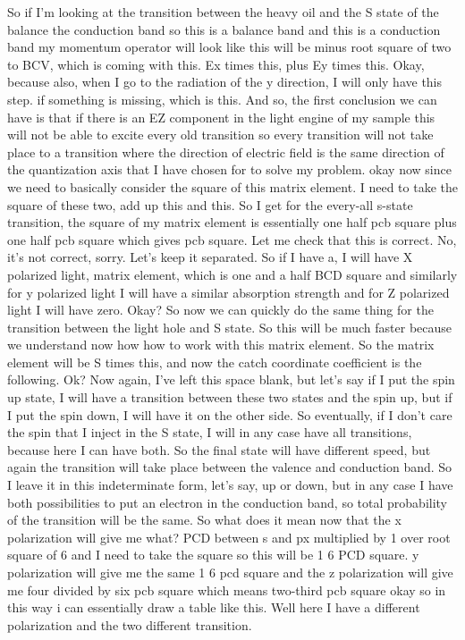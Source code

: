 So if I'm looking at the transition between the heavy oil and the S state of the balance the conduction band so this is a balance band and this is a conduction band my momentum operator will look like this will be minus root square of two to BCV, which is coming with this. Ex times this, plus Ey times this. Okay, because also, when I go to the radiation of the y direction, I will only have this step. if something is missing, which is this. And so, the first conclusion we can have is that if there is an EZ component in the light engine of my sample this will not be able to excite every old transition so every transition will not take place to a transition where the direction of electric field is the same direction of the quantization axis that I have chosen for to solve my problem. okay now since we need to basically consider the square of this matrix element. I need to take the square of these two, add up this and this. So I get for the every-all s-state transition, the square of my matrix element is essentially one half pcb square plus one half pcb square which gives pcb square. Let me check that this is correct. No, it's not correct, sorry. Let's keep it separated. So if I have a, I will have X polarized light, matrix element, which is one and a half BCD square and similarly for y polarized light I will have a similar absorption strength and for Z polarized light I will have zero. Okay? So now we can quickly do the same thing for the transition between the light hole and S state. So this will be much faster because we understand now how how to work with this matrix element. So the matrix element will be S times this, and now the catch coordinate coefficient is the following. Ok? Now again, I've left this space blank, but let's say if I put the spin up state, I will have a transition between these two states and the spin up, but if I put the spin down, I will have it on the other side. So eventually, if I don't care the spin that I inject in the S state, I will in any case have all transitions, because here I can have both. So the final state will have different speed, but again the transition will take place between the valence and conduction band. So I leave it in this indeterminate form, let's say, up or down, but in any case I have both possibilities to put an electron in the conduction band, so total probability of the transition will be the same. So what does it mean now that the x polarization will give me what? PCD between s and px multiplied by 1 over root square of 6 and I need to take the square so this will be 1 6 PCD square. y polarization will give me the same 1 6 pcd square and the z polarization will give me four divided by six pcb square which means two-third pcb square okay so in this way i can essentially draw a table like this. Well here I have a different polarization and the two different transition.
